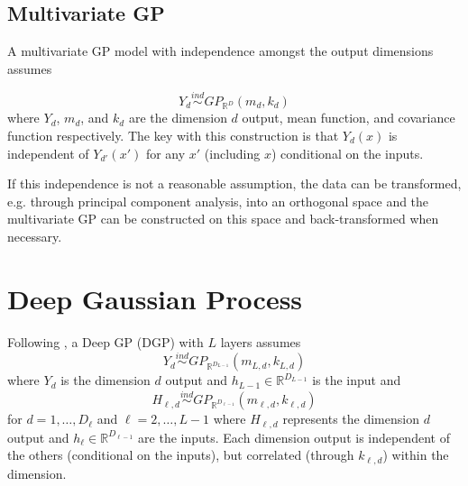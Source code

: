 \documentclass{article}
\newcommand{\ind}{\stackrel{ind}{\sim}}
\newcommand{\1}{\mathbbm{1}}
\begin{document}
\subsection{Multivariate GP}

A multivariate GP model with independence amongst the output dimensions assumes

\[
Y_d \ind GP_{\mathbb{R}^{D}}(m_{d},k_{d})
\]
where $Y_d$, $m_d$, and $k_d$ are the dimension $d$ output, mean function,
and covariance function respectively.
The key with this construction is that $Y_d(x)$ is independent of
$Y_{d'}(x')$ for any $x'$ (including $x$) conditional on the inputs.

If this independence is not a reasonable assumption,
the data can be transformed,
e.g. through principal component analysis, into an orthogonal space and
the multivariate GP can be constructed on this space and
back-transformed when necessary.




\section{Deep Gaussian Process}
\label{sec:deepgp}

Following \cite{damianou2013deep},
a Deep GP (DGP) with $L$ layers assumes
\begin{equation}
Y_d \ind GP_{\mathbb{R}^{D_{L-1}}}(m_{L,d},k_{L,d})
\label{eq:y}
\end{equation}
where $Y_d$ is the dimension $d$ output and $h_{L-1} \in \mathbb{R}^{D_{L-1}}$ is the
input
and
\begin{equation}
H_{\ell,d} \ind GP_{\mathbb{R}^{D_{\ell-1}}}(m_{\ell,d},k_{\ell,d})
\end{equation}
for $d=1,\ldots,D_{\ell}$ and $\ell = 2,\ldots,L-1$
where $H_{\ell,d}$ represents the dimension $d$ output and
$h_{\ell} \in \mathbb{R}^{D_{\ell-1}}$ are the inputs.
Each dimension output is independent of the others (conditional on the inputs),
but correlated (through $k_{\ell,d}$) within the dimension.
\end{document}
